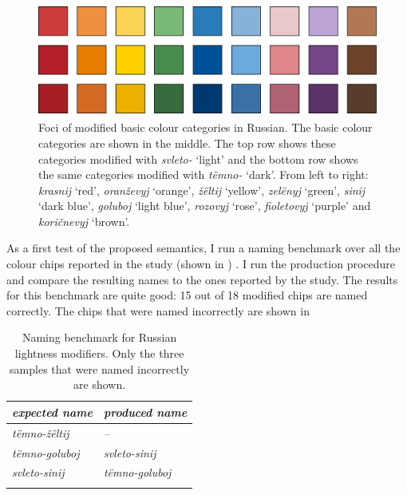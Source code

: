 \begin{figure}[htpb]
  \centering
  \includegraphics[height=3.75cm]{./achromatic/figures/russian-modified-foci.pdf}
  \caption[Foci of modified basic colour categories in Russian]{Foci
    of modified basic colour categories in Russian. The basic colour
    categories are shown in the middle. The top row shows these
    categories modified with \textit{svleto-} `light' and the bottom
    row shows the same categories modified with \textit{t\"emno-}
    `dark'.  From left to right: \textit{krasnij} `red', \textit{oran\v
    zevyj} `orange', \textit{\v z\"eltij} `yellow',
    \textit{zel\"enyj} `green', \textit{sinij} `dark blue',
    \textit{goluboj} `light blue', \textit{rozovyj} `rose',
    \textit{fioletovyj} `purple' and \textit{kori\v cnevyj} `brown'.}
  \label{f:ams-russian-basic-modifiers}
\end{figure}

As a first test of the proposed semantics, I run a naming benchmark
over all the colour chips reported in the study (shown in )
. 
I run the production
procedure and compare the resulting names to the ones reported by the
study. The results for this benchmark are quite good: 15 out of 18
modified chips are named correctly. The chips that were named
incorrectly are shown in 

\begin{table}[htpb]
  \centering
  \begin{tabular}{>{\itshape}l>{\itshape}l}
  \lsptoprule
    \normalfont expected name & \normalfont produced name \\
    \midrule
    t\"emno-\v z\"eltij & \normalfont -- \\
    t\"emno-goluboj & svleto-sinij \\
    svleto-sinij & t\"emno-goluboj\\
    \lspbottomrule
  \end{tabular}
  \caption[Naming benchmark for Russian lightness modifiers]{Naming benchmark for Russian lightness modifiers. Only the three samples that were named incorrectly are shown.}
  \label{t:ams-russian-naming-benchmark}
\end{table}

